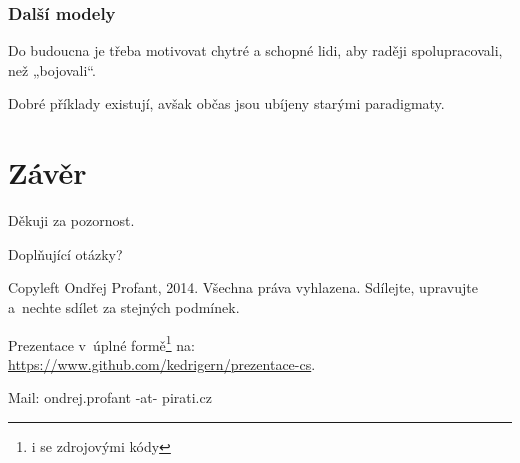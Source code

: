 \documentclass[xetex]{beamer}
\begin{document}
\begin{frame}
	\frametitle{Další modely}
	
	Do budoucna je třeba motivovat chytré a schopné lidi,
	aby raději spolupracovali, než „bojovali“.

	\bigskip

	Dobré příklady existují, 
	avšak občas jsou ubíjeny starými paradigmaty.
\end{frame}

\section{Závěr}

\begin{frame}
	Děkuji za pozornost.

	\bigskip
	
	Doplňující otázky?

	\bigskip

	\bigskip

	\scriptsize
	Copyleft Ondřej Profant, 2014. 
	Všechna práva vyhlazena. Sdílejte, upravujte a~nechte sdílet za stejných podmínek. 

	\bigskip

	Prezentace v~úplné formě\footnote{i se zdrojovými kódy} na:\\ 
	\url{https://www.github.com/kedrigern/prezentace-cs}.

	\bigskip

	Mail: ondrej.profant -at- pirati.cz 
\end{frame}
\end{document}
